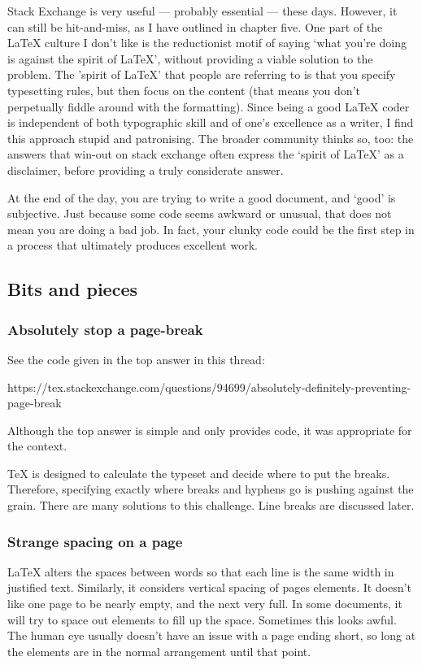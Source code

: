 \documentclass[11pt, oneside]{memoir}
\begin{document}
Stack Exchange is very useful — probably essential — these days. However, it can still be hit-and-miss, as I have outlined in chapter five. One part of the LaTeX culture I don't like is the reductionist motif of saying `what you're doing is against the spirit of LaTeX', without providing a viable solution to the problem. The 'spirit of LaTeX' that people are referring to is that you specify typesetting rules, but then focus on the content (that means you don't perpetually fiddle around with the formatting). Since being a good LaTeX coder is independent of both typographic skill and of one's excellence as a writer, I find this approach stupid and patronising. The broader community thinks so, too: the answers that win-out on stack exchange often express the `spirit of LaTeX' as a disclaimer, before providing a truly considerate answer. 

At the end of the day, you are trying to write a good document, and `good' is subjective. Just because some code seems awkward or unusual, that does not mean you are doing a bad job. In fact, your clunky code could be the first step in a process that ultimately produces excellent work.

\subsection{Bits and pieces}

\subsubsection{Absolutely stop a page-break}

See the code given in the top answer in this thread:

https://tex.stackexchange.com/questions/94699/absolutely-definitely-preventing-page-break

Although the top answer is simple and only provides code, it was appropriate for the context.

TeX is designed to calculate the typeset and decide where to put the breaks. Therefore, specifying exactly where breaks and hyphens go is pushing against the grain. There are many solutions to this challenge. Line breaks are discussed later.

\subsubsection{Strange spacing on a page}

LaTeX alters the spaces between words so that each line is the same width in justified text. Similarly, it considers vertical spacing of pages elements. It doesn't like one page to be nearly empty, and the next very full. In some documents, it will try to space out elements to fill up the space. Sometimes this looks awful. The human eye usually doesn't have an issue with a page ending short, so long at the elements are in the normal arrangement until that point.
\end{document}
